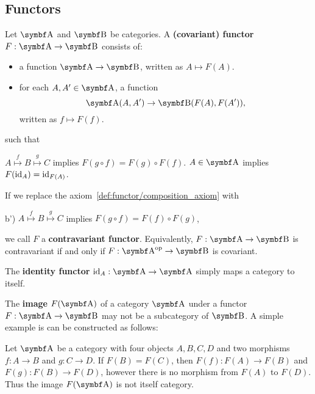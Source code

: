 \subsection{Functors}\label{subsec:functors}

\begin{definition}\label{def:functor}\cite[definitions 1.2.1, 1.2.10]{Leinster2014}
  Let \( \Bold A \) and \( \Bold B \) be categories. A \textbf{(covariant) functor} \( F: \Bold A \to \Bold B \) consists of:
  \begin{itemize}
    \item a function \( \Bold A \to \Bold B \), written as \( A \mapsto F(A) \).
    \item for each \( A, A' \in \Bold A \), a function
    \begin{equation*}
      \Bold{A}(A, A') \to \Bold{B}(F(A), F(A')),
    \end{equation*}
    written as \( f \mapsto F(f) \).
  \end{itemize}
  such that
  \begin{defenum}
     \( A \overset f \mapsto B \overset g \mapsto C \) implies \( F(g \circ f) = F(g) \circ F(f) \).
     \( A \in \Bold A \) implies \( F(\operatorname{id}_A) = \operatorname{id}_{F(A)} \).
  \end{defenum}

  If we replace the axiom~\cref{def:functor/composition_axiom} with
  \begin{defenum}
    \item[b')]\label{def:functor/contravariant_composition_axiom} \( A \overset f \mapsto B \overset g \mapsto C \) implies \( F(g \circ f) = F(f) \circ F(g) \),
  \end{defenum}
  we call \( F \) a \textbf{contravariant functor}. Equivalently, \( F: \Bold A \to \Bold B \) is contravariant if and only if \( F: \Bold{A}^{\Op} \to \Bold B \) is covariant.

  The \textbf{identity functor} \( \Id_A: \Bold A \to \Bold A \) simply maps a category to itself.
\end{definition}

\begin{note}\label{note:image_of_functor_maybe_not_subcategory}
  The \textbf{image} \( F(\Bold A) \) of a category \( \Bold A \) under a functor \( F: \Bold A \to \Bold B \) may not be a subcategory of \( \Bold B \). A simple example is can be constructed as follows:

  Let \( \Bold A \) be a category with four objects \( A, B, C, D \) and two morphisms \( f: A \to B \) and \( g: C \to D \). If \( F(B) = F(C) \), then \( F(f): F(A) \to F(B) \) and \( F(g): F(B) \to F(D) \), however there is no morphism from \( F(A) \) to \( F(D) \). Thus the image \( F(\Bold A) \) is not itself category.
\end{note}

